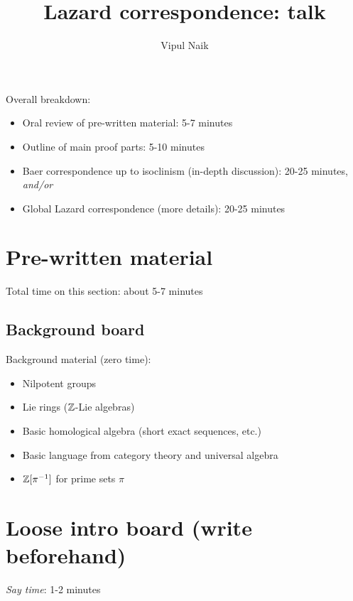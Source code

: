 \documentclass[10pt]{amsart}
\title{Lazard correspondence: talk}
\author{Vipul Naik}
\begin{document}
\maketitle
\onehalfspacing

Overall breakdown:

\begin{itemize}
\item Oral review of pre-written material: 5-7 minutes
\item Outline of main proof parts: 5-10 minutes
\item Baer correspondence up to isoclinism (in-depth discussion): 20-25 minutes, {\em and/or}
\item Global Lazard correspondence (more details): 20-25 minutes
\end{itemize}

\section{Pre-written material}

Total time on this section: about 5-7 minutes


\subsection{Background board}

Background material (zero time):

\begin{itemize}
\item Nilpotent groups
\item Lie rings ($\mathbb{Z}$-Lie algebras)
\item Basic homological algebra (short exact sequences, etc.)
\item Basic language from category theory and universal algebra
\item $\mathbb{Z}[\pi^{-1}]$ for prime sets $\pi$
\end{itemize}

\section{Loose intro board (write beforehand)}

{\em Say time}: 1-2 minutes
\end{document}
